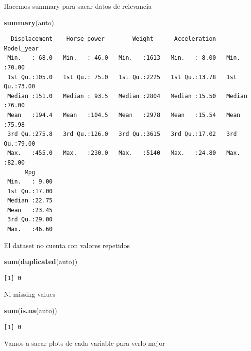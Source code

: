 \documentclass[
]{article}
\newenvironment{Shaded}{\begin{snugshade}}{\end{snugshade}}
\newcommand{\KeywordTok}[1]{\textcolor[rgb]{0.13,0.29,0.53}{\textbf{#1}}}
\newcommand{\NormalTok}[1]{#1}
\begin{document}
Hacemos summary para sacar datos de relevancia

\begin{Shaded}
\begin{Highlighting}[]
\KeywordTok{summary}\NormalTok{(auto)}
\end{Highlighting}
\end{Shaded}

\begin{verbatim}
  Displacement    Horse_power        Weight      Acceleration     Model_year   
 Min.   : 68.0   Min.   : 46.0   Min.   :1613   Min.   : 8.00   Min.   :70.00  
 1st Qu.:105.0   1st Qu.: 75.0   1st Qu.:2225   1st Qu.:13.78   1st Qu.:73.00  
 Median :151.0   Median : 93.5   Median :2804   Median :15.50   Median :76.00  
 Mean   :194.4   Mean   :104.5   Mean   :2978   Mean   :15.54   Mean   :75.98  
 3rd Qu.:275.8   3rd Qu.:126.0   3rd Qu.:3615   3rd Qu.:17.02   3rd Qu.:79.00  
 Max.   :455.0   Max.   :230.0   Max.   :5140   Max.   :24.80   Max.   :82.00  
      Mpg       
 Min.   : 9.00  
 1st Qu.:17.00  
 Median :22.75  
 Mean   :23.45  
 3rd Qu.:29.00  
 Max.   :46.60  
\end{verbatim}

El dataset no cuenta con valores repetidos

\begin{Shaded}
\begin{Highlighting}[]
\KeywordTok{sum}\NormalTok{(}\KeywordTok{duplicated}\NormalTok{(auto))}
\end{Highlighting}
\end{Shaded}

\begin{verbatim}
[1] 0
\end{verbatim}

Ni missing values

\begin{Shaded}
\begin{Highlighting}[]
\KeywordTok{sum}\NormalTok{(}\KeywordTok{is.na}\NormalTok{(auto))}
\end{Highlighting}
\end{Shaded}

\begin{verbatim}
[1] 0
\end{verbatim}

Vamos a sacar plots de cada variable para verlo mejor
\end{document}
